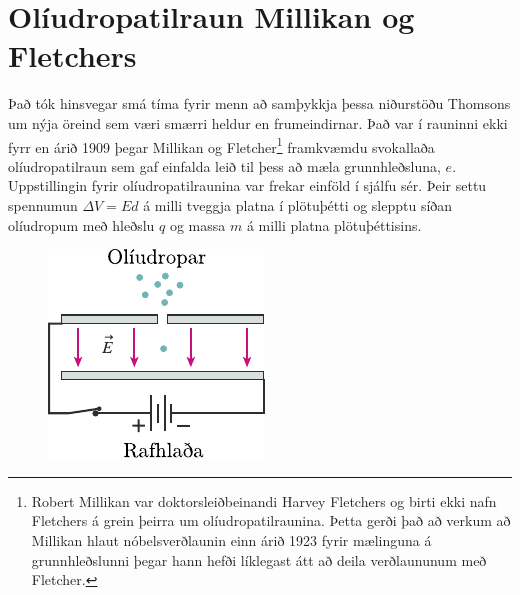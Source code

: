 \ifdefined \wholebook \else\documentclass[oneside]{book}\usepackage{EdlBook}\graphicspath{{figures/}}
\begin{document}
\section{Olíudropatilraun Millikan og Fletchers}

Það tók hinsvegar smá tíma fyrir menn að samþykkja þessa niðurstöðu Thomsons um nýja öreind sem væri smærri heldur en frumeindirnar. Það var í rauninni ekki fyrr en árið 1909 þegar Millikan og Fletcher\footnote{Robert Millikan var doktorsleiðbeinandi Harvey Fletchers og birti ekki nafn Fletchers á grein þeirra um olíudropatilraunina. Þetta gerði það að verkum að Millikan hlaut nóbelsverðlaunin einn árið 1923 fyrir mælinguna á grunnhleðslunni þegar hann hefði líklegast átt að deila verðlaununum með Fletcher.} framkvæmdu svokallaða olíudropatilraun sem gaf einfalda leið til þess að mæla grunnhleðsluna, $e$. Uppstillingin fyrir olíudropatilraunina var frekar einföld í sjálfu sér. Þeir settu spennumun $\Delta V = Ed$ á milli tveggja platna í plötuþétti og slepptu síðan olíudropum með hleðslu $q$ og massa $m$ á milli platna plötuþéttisins.

\begin{figure}[H]
    \centering
    \includegraphics{figures/oliudropar.pdf}
\end{figure}
\end{document}
